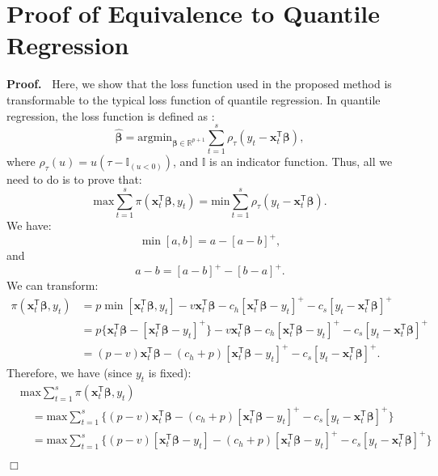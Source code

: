\documentclass{article}
\newenvironment{proof}
 {\begin{trivlist} \item[] {\bf Proof.\ }}{\hfill$\Box$ \end{trivlist}}
\begin{document}
\section{Proof of Equivalence to Quantile Regression}
\label{app:C}
\begin{proof}
Here, we show that the loss function used in the proposed method is transformable to the typical loss function of quantile regression. In quantile regression, the loss function is defined as \cite{KH01}:
\[
    \hat{\boldsymbol{\beta}}=\text{argmin}_{\boldsymbol{\beta}\in \mathbb{R}^{p+1}}\displaystyle\sum_{t=1}^s\rho_{\tau}(y_t-\mathbf{x}_t^{\mathsf{T}}\boldsymbol{\beta}),
\]
where $\displaystyle \rho_{\tau}(u)=u(\tau-\mathbb{I}_{(u<0)})$, and $\mathbb{I}$ is an indicator function. Thus, all we need to do is to prove that:
\[
    \text{max}\displaystyle\sum_{t=1}^s{\pi(\mathbf{x}_t^{\mathsf{T}}\boldsymbol{\beta},y_t)}=\text{min}\displaystyle\sum_{t=1}^s\rho_{\tau}(y_t-\mathbf{x}_t^{\mathsf{T}}\boldsymbol{\beta}).
\]
We have:
\[
    \min[a,b]=a-[a-b]^+,
\]
and
\[
    a-b=[a-b]^+-[b-a]^+.
\]
We can transform:
\[
    \begin{aligned}
        \pi(\mathbf{x}_t^{\mathsf{T}}\boldsymbol{\beta},y_t)
        &=p\min[\mathbf{x}_t^{\mathsf{T}}\boldsymbol{\beta},y_t]-v\mathbf{x}_t^{\mathsf{T}}\boldsymbol{\beta}-c_h[\mathbf{x}_t^{\mathsf{T}}\boldsymbol{\beta}-y_t]^+-c_s[y_t-\mathbf{x}_t^{\mathsf{T}}\boldsymbol{\beta}]^+\\
        &=p\{\mathbf{x}_t^{\mathsf{T}}\boldsymbol{\beta}-[\mathbf{x}_t^{\mathsf{T}}\boldsymbol{\beta}-y_t]^+\}-v\mathbf{x}_t^{\mathsf{T}}\boldsymbol{\beta}-c_h[\mathbf{x}_t^{\mathsf{T}}\boldsymbol{\beta}-y_t]^+-c_s[y_t-\mathbf{x}_t^{\mathsf{T}}\boldsymbol{\beta}]^+\\
        &=(p-v)\mathbf{x}_t^{\mathsf{T}}\boldsymbol{\beta}-(c_h+p)[\mathbf{x}_t^{\mathsf{T}}\boldsymbol{\beta}-y_t]^+-c_s[y_t-\mathbf{x}_t^{\mathsf{T}}\boldsymbol{\beta}]^+.
    \end{aligned}
\]
Therefore, we have (since $y_t$ is fixed):
\[
    \begin{aligned}
        &\text{max}\displaystyle\sum_{t=1}^s{\pi(\mathbf{x}_t^{\mathsf{T}}\boldsymbol{\beta},y_t)}\\
        &\quad=\text{max}\displaystyle\sum_{t=1}^s\{(p-v)\mathbf{x}_t^{\mathsf{T}}\boldsymbol{\beta}-(c_h+p)[\mathbf{x}_t^{\mathsf{T}}\boldsymbol{\beta}-y_t]^+-c_s[y_t-\mathbf{x}_t^{\mathsf{T}}\boldsymbol{\beta}]^+\}\\
        &\quad=\text{max}\displaystyle\sum_{t=1}^s\{(p-v)[\mathbf{x}_t^{\mathsf{T}}\boldsymbol{\beta}-y_t]-(c_h+p)[\mathbf{x}_t^{\mathsf{T}}\boldsymbol{\beta}-y_t]^+-c_s[y_t-\mathbf{x}_t^{\mathsf{T}}\boldsymbol{\beta}]^+\}\\

\end{aligned}\]
\end{proof}
\end{document}
